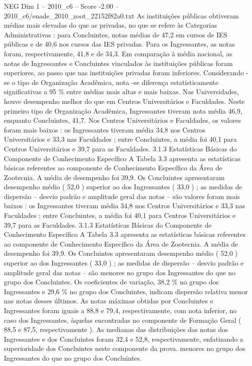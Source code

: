 \begin{textsample}{NEG Dim 1 – 2010\_c6 – Score -2.00 – 2010\_c6/enade\_2010\_zoot\_22152f82a0.txt}
As instituições públicas obtiveram médias mais elevadas do que as privadas, no que se refere às Categorias Administrativas : para Concluintes, notas médias de 47,2 em cursos de IES públicas e de 40,6 nos cursos das IES privadas.
Para os Ingressantes, as notas foram, respectivamente, 41,8 e de 34,3.
Em comparação à média nacional, as notas de Ingressantes e Concluintes vinculados às instituições públicas foram superiores, ao passo que nas instituições privadas foram inferiores.
Considerando -se o tipo de Organização Acadêmica, nota -se diferença estatisticamente significativas a 95 \% entre médias mais altas e mais baixas.
Nas Universidades, houve desempenho melhor do que em Centros Universitários e Faculdades.
Neste primeiro tipo de Organização Acadêmica, Ingressantes tiveram nota média 46,9, enquanto Concluintes, 41,7.
Nos Centros Universitários e Faculdades, os valores foram mais baixos : os Ingressantes tiveram média 34,8 nos Centros Universitários e 33,3 nas Faculdades ; entre Concluintes, a média foi 40,1 para Centros Universitários e 39,7 para as Faculdades. 3.1.3 Estatísticas Básicas do Componente de Conhecimento Específico A Tabela 3.3 apresenta as estatísticas básicas referentes ao componente de Conhecimento Específico da Área de Zootecnia.
A média de desempenho foi 39,9.
Os Concluintes apresentaram desempenho médio ( 52,0 ) superior ao dos Ingressantes ( 33,0 ) ; as medidas de dispersão – desvio padrão e amplitude geral das notas – são valores foram mais baixos : os Ingressantes tiveram média 34,8 nos Centros Universitários e 33,3 nas Faculdades ; entre Concluintes, a média foi 40,1 para Centros Universitários e 39,7 para as Faculdades. 3.1.3 Estatísticas Básicas do Componente de Conhecimento Específico A Tabela 3.3 apresenta as estatísticas básicas referentes ao componente de Conhecimento Específico da Área de Zootecnia.
A média de desempenho foi 39,9.
Os Concluintes apresentaram desempenho médio ( 52,0 ) superior ao dos Ingressantes ( 33,0 ) ; as medidas de dispersão – desvio padrão e amplitude geral das notas – são menores no grupo dos Ingressantes do que no grupo dos Concluintes.
Os coeficientes de variação, 38,2 \% no grupo dos Ingressantes e 29,6 \% no grupo dos Concluintes, indicam dispersão relativa menor nas notas desses últimos.
As notas máximas obtidas por Concluintes e Ingressantes foram iguais a 88,8 e 79,4, respectivamente, com nota inferior, no caso dos Ingressantes, àquelas encontradas no componente de Formação Geral ( 88,5 e 87,5, respectivamente ).
As medianas das distribuições das notas dos Ingressantes e dos Concluintes foram 32,4 e 52,8, respectivamente, enfatizando a superioridade dos Concluintes neste componente da prova. menores no grupo dos Ingressantes do que no grupo dos Concluintes.

\end{textsample}
